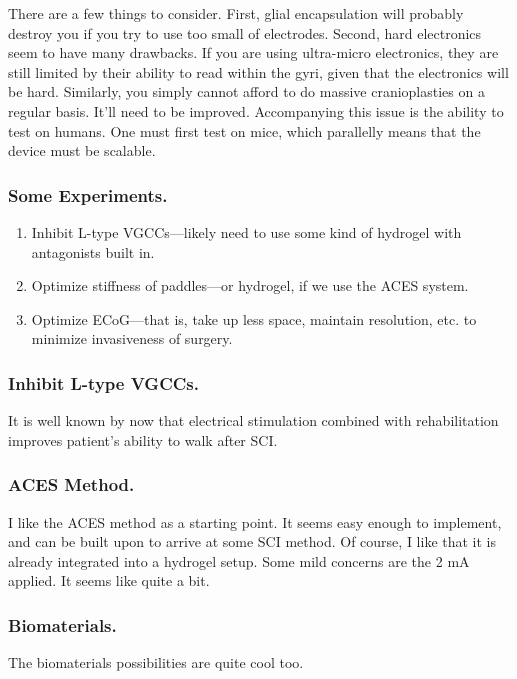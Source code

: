 There are a few things to consider. First, glial encapsulation will probably destroy you if you try to use too small of electrodes. Second, hard electronics seem to have many drawbacks. If you are using ultra-micro electronics, they are still limited by their ability to read within the gyri, given that the electronics will be hard. Similarly, you simply cannot afford to do massive cranioplasties on a regular basis. It'll need to be improved. Accompanying this issue is the ability to test on humans. One must first test on mice, which parallelly means that the device must be scalable. 


\subsubsection{Some Experiments.}


\begin{enumerate}
    \item Inhibit L-type VGCCs---likely need to use some kind of hydrogel with antagonists built in. 
    \item Optimize stiffness of paddles---or hydrogel, if we use the ACES system. 
    \item Optimize ECoG---that is, take up less space, maintain resolution, etc. to minimize invasiveness of surgery. 
\end{enumerate}

\subsubsection{Inhibit L-type VGCCs.}
It is well known by now that electrical stimulation combined with rehabilitation improves patient's ability to walk after SCI. 

\subsubsection{ACES Method.}

I like the ACES method as a starting point. It seems easy enough to implement, and can be built upon to arrive at some SCI method. Of course, I like that it is already integrated into a hydrogel setup. Some mild concerns are the 2 mA applied. It seems like quite a bit. 

\subsubsection{Biomaterials.}

The biomaterials possibilities are quite cool too. 


